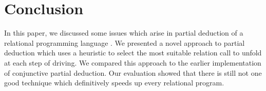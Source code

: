 \section{Conclusion}

In this paper, we discussed some issues which arise in partial deduction of a relational programming language \mk.
We presented a novel approach to partial deduction which uses a heuristic to select the most suitable relation call to unfold at each step of driving.
We compared this approach to the earlier implementation of conjunctive partial deduction.
Our evaluation showed that there is still not one good technique which definitively speeds up every relational program.
